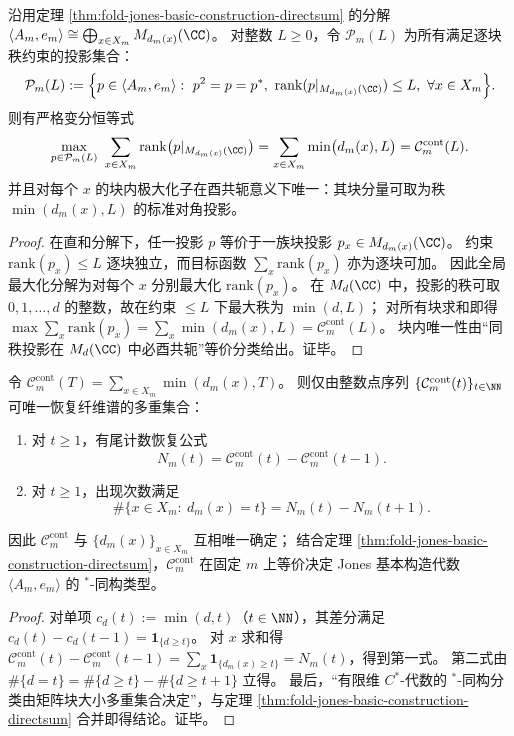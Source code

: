 \begin{theorem}[限秩投影的变分极值与连续容量曲线]\label{thm:op-algebra-oracle-projection-variational-capacity}
沿用定理 \ref{thm:fold-jones-basic-construction-directsum} 的分解
\(
\langle A_m,e_m\rangle\cong\bigoplus_{x\in X_m}M_{d_m(x)}(\CC)
\)。
对整数 \(L\ge 0\)，令 \(\mathcal P_m(L)\) 为所有满足逐块秩约束的投影集合：
\[
\mathcal P_m(L):=
\Bigl\{
p\in \langle A_m,e_m\rangle:\ p^2=p=p^\ast,\ 
\mathrm{rank}(p|_{M_{d_m(x)}(\CC)})\le L,\ \forall x\in X_m
\Bigr\}.
\]
则有严格变分恒等式
\[
\max_{p\in\mathcal P_m(L)}\ \sum_{x\in X_m}\mathrm{rank}\bigl(p|_{M_{d_m(x)}(\CC)}\bigr)
=\sum_{x\in X_m}\min\bigl(d_m(x),L\bigr)
=\mathcal C_m^{\mathrm{cont}}(L).
\]
并且对每个 \(x\) 的块内极大化子在酉共轭意义下唯一：其块分量可取为秩 \(\min(d_m(x),L)\) 的标准对角投影。
\end{theorem}
\begin{proof}
在直和分解下，任一投影 \(p\) 等价于一族块投影 \(p_x\in M_{d_m(x)}(\CC)\)。
约束 \(\mathrm{rank}(p_x)\le L\) 逐块独立，而目标函数 \(\sum_x \mathrm{rank}(p_x)\) 亦为逐块可加。
因此全局最大化分解为对每个 \(x\) 分别最大化 \(\mathrm{rank}(p_x)\)。
在 \(M_d(\CC)\) 中，投影的秩可取 \(0,1,\dots,d\) 的整数，故在约束 \(\le L\) 下最大秩为 \(\min(d,L)\)；
对所有块求和即得
\(
\max \sum_x \mathrm{rank}(p_x)=\sum_x \min(d_m(x),L)=\mathcal C_m^{\mathrm{cont}}(L)
\)。
块内唯一性由“同秩投影在 \(M_d(\CC)\) 中必酉共轭”等价分类给出。证毕。
\end{proof}

\begin{corollary}\label{cor:op-algebra-capacity-curve-complete-invariant}
令 \(\mathcal C_m^{\mathrm{cont}}(T)=\sum_{x\in X_m}\min(d_m(x),T)\)。
则仅由整数点序列 \(\{\mathcal C_m^{\mathrm{cont}}(t)\}_{t\in\NN}\) 可唯一恢复纤维谱的多重集合：
\begin{enumerate}
  \item 对 \(t\ge 1\)，有尾计数恢复公式
  \[
  N_m(t)=\mathcal C_m^{\mathrm{cont}}(t)-\mathcal C_m^{\mathrm{cont}}(t-1).
  \]
  \item 对 \(t\ge 1\)，出现次数满足
  \[
  \#\{x\in X_m:\ d_m(x)=t\}=N_m(t)-N_m(t+1).
  \]
\end{enumerate}
因此 \(\mathcal C_m^{\mathrm{cont}}\) 与 \(\{d_m(x)\}_{x\in X_m}\) 互相唯一确定；
结合定理 \ref{thm:fold-jones-basic-construction-directsum}，\(\mathcal C_m^{\mathrm{cont}}\) 在固定 \(m\) 上等价决定 Jones 基本构造代数 \(\langle A_m,e_m\rangle\) 的 \(^\ast\)-同构类型。
\end{corollary}
\begin{proof}
对单项 \(c_d(t):=\min(d,t)\)（\(t\in\NN\)），其差分满足
\(
c_d(t)-c_d(t-1)=\mathbf 1_{\{d\ge t\}}
\)。
对 \(x\) 求和得
\(
\mathcal C_m^{\mathrm{cont}}(t)-\mathcal C_m^{\mathrm{cont}}(t-1)=\sum_x \mathbf 1_{\{d_m(x)\ge t\}}=N_m(t)
\)，得到第一式。
第二式由
\(
\#\{d=t\}=\#\{d\ge t\}-\#\{d\ge t+1\}
\)
立得。
最后，“有限维 \(C^\ast\)-代数的 \(^\ast\)-同构分类由矩阵块大小多重集合决定”，与定理 \ref{thm:fold-jones-basic-construction-directsum} 合并即得结论。证毕。
\end{proof}

